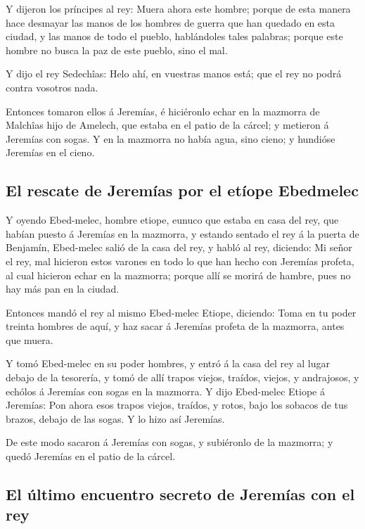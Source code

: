  Y dijeron los príncipes al rey: Muera ahora este hombre;
porque de esta manera hace desmayar las manos de los hombres de guerra
que han quedado en esta ciudad, y las manos de todo el pueblo,
hablándoles tales palabras; porque este hombre no busca la paz de este
pueblo, sino el mal.

 Y dijo el rey Sedechîas: Helo ahí, en vuestras manos está;
que el rey no podrá contra vosotros nada.

 Entonces tomaron ellos á Jeremías, é hiciéronlo echar en la
mazmorra de Malchîas hijo de Amelech, que estaba en el patio de la
cárcel; y metieron á Jeremías con sogas. Y en la mazmorra no había agua,
sino cieno; y hundióse Jeremías en el cieno.

\hypertarget{el-rescate-de-jeremuxedas-por-el-etuxedope-ebedmelec}{%
\subsection{El rescate de Jeremías por el etíope
Ebedmelec}\label{el-rescate-de-jeremuxedas-por-el-etuxedope-ebedmelec}}

 Y oyendo Ebed-melec, hombre etiope, eunuco que estaba en
casa del rey, que habían puesto á Jeremías en la mazmorra, y estando
sentado el rey á la puerta de Benjamín,  Ebed-melec salió de
la casa del rey, y habló al rey, diciendo:  Mi señor el rey,
mal hicieron estos varones en todo lo que han hecho con Jeremías
profeta, al cual hicieron echar en la mazmorra; porque allí se morirá de
hambre, pues no hay más pan en la ciudad.

 Entonces mandó el rey al mismo Ebed-melec Etiope,
diciendo: Toma en tu poder treinta hombres de aquí, y haz sacar á
Jeremías profeta de la mazmorra, antes que muera.

 Y tomó Ebed-melec en su poder hombres, y entró á la casa
del rey al lugar debajo de la tesorería, y tomó de allí trapos viejos,
traídos, viejos, y andrajosos, y echólos á Jeremías con sogas en la
mazmorra.  Y dijo Ebed-melec Etiope á Jeremías: Pon ahora
esos trapos viejos, traídos, y rotos, bajo los sobacos de tus brazos,
debajo de las sogas. Y lo hizo así Jeremías.

 De este modo sacaron á Jeremías con sogas, y subiéronlo de
la mazmorra; y quedó Jeremías en el patio de la cárcel.

\hypertarget{el-uxfaltimo-encuentro-secreto-de-jeremuxedas-con-el-rey}{%
\subsection{El último encuentro secreto de Jeremías con el
rey}\label{el-uxfaltimo-encuentro-secreto-de-jeremuxedas-con-el-rey}}

